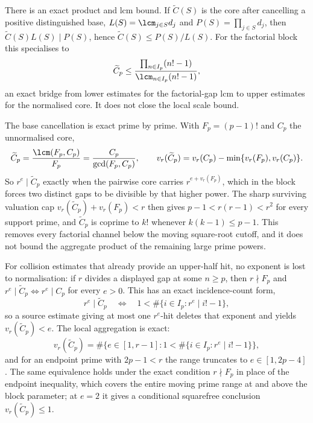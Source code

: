 \documentclass[11pt]{article}
\begin{document}
There is an exact product and lcm bound.  If $\widetilde C(S)$ is the core
after cancelling a positive distinguished base, $L(S)=\lcm_{j\in S}d_j$ and
$P(S)=\prod_{j\in S}d_j$, then $\widetilde C(S)L(S)\mid P(S)$, hence
$\widetilde C(S)\le P(S)/L(S)$.  For the factorial block this specialises to
\[
 \widetilde C_p\le\frac{\prod_{n\in I_p}(n!-1)}{\lcm_{n\in I_p}(n!-1)},
\]
an exact bridge from lower estimates for the factorial-gap lcm to upper
estimates for the normalised core.  It does not close the local scale bound.

The base cancellation is exact prime by prime.  With $F_p=(p-1)!$ and $C_p$
the unnormalised core,
\[
 \widetilde C_p=\frac{\lcm(F_p,C_p)}{F_p}=\frac{C_p}{\gcd(F_p,C_p)},\qquad
 v_r(\widetilde C_p)=v_r(C_p)-\min\{v_r(F_p),v_r(C_p)\} .
\]
So $r^e\mid\widetilde C_p$ exactly when the pairwise core carries
$r^{e+v_r(F_p)}$, which in the block forces two distinct gaps to be divisible
by that higher power.  The sharp surviving valuation cap
$v_r(\widetilde C_p)+v_r(F_p)<r$ then gives $p-1<r(r-1)<r^2$ for every
support prime, and $\widetilde C_p$ is coprime to $k!$ whenever
$k(k-1)\le p-1$.  This removes every factorial channel below the moving
square-root cutoff, and it does not bound the aggregate product of the
remaining large prime powers.

For collision estimates that already provide an upper-half hit, no exponent
is lost to normalisation: if $r$ divides a displayed gap at some $n\ge p$,
then $r\nmid F_p$ and $r^e\mid\widetilde C_p\iff r^e\mid C_p$ for every
$e>0$.  This has an exact incidence-count form,
\[
 r^e\mid\widetilde C_p
 \quad\Longleftrightarrow\quad
 1<\#\{i\in I_p:r^e\mid i!-1\},
\]
so a source estimate giving at most one $r^e$-hit deletes that exponent and
yields $v_r(\widetilde C_p)<e$.  The local aggregation is exact:
\[
 v_r(\widetilde C_p)=\#\bigl\{e\in[1,r-1]:1<\#\{i\in I_p:r^e\mid i!-1\}\bigr\},
\]
and for an endpoint prime with $2p-1<r$ the range truncates to
$e\in[1,2p-4]$.  The same equivalence holds under the exact condition
$r\nmid F_p$ in place of the endpoint inequality, which covers the entire
moving prime range at and above the block parameter; at $e=2$ it gives a
conditional squarefree conclusion $v_r(\widetilde C_p)\le1$.
\end{document}
